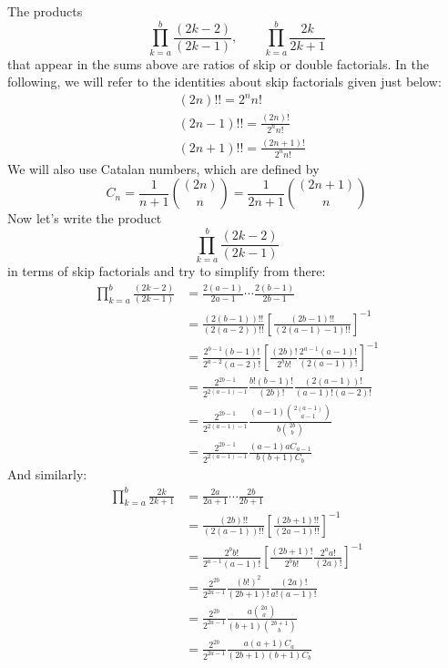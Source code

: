 \documentclass[11pt]{article}
\theoremstyle{definition}
\theoremstyle{definition}
\theoremstyle{plain}
\theoremstyle{plain}
\theoremstyle{plain}
\theoremstyle{definition}
\begin{document}
The products
\begin{equation*}
\prod\limits_{k=a}^{b}\frac{(2k-2)}{(2k-1)},\qquad\prod\limits_{k=a}^b\frac{2k}{2k+1}
\end{equation*}
that appear in the sums above are ratios of skip or double factorials. In the following, we will refer to the identities about skip factorials given just below:
\begin{align*}
&(2n)!! = 2^nn! \\
&(2n-1)!! = \frac{(2n)!}{2^nn!} \\
&(2n+1)!! = \frac{(2n+1)!}{2^nn!}
\end{align*}
We will also use Catalan numbers, which are defined by
\begin{equation*}
C_n = \frac{1}{n+1}\binom{(2n)}{n} = \frac{1}{2n+1}\binom{(2n+1)}{n}
\end{equation*}
Now let's write the product
\begin{equation*}
\prod\limits_{k=a}^{b}\frac{(2k-2)}{(2k-1)}
\end{equation*}
in terms of skip factorials and try to simplify from there:
\begin{align*}
\prod\limits_{k=a}^{b}\frac{(2k-2)}{(2k-1)} &= \frac{2(a-1)}{2a-1}\cdots\frac{2(b-1)}{2b-1} \\
&= \frac{(2(b-1))!!}{(2(a-2))!!}\left[\frac{(2b-1)!!}{(2(a-1)-1)!!}\right]^{-1} \\
&= \frac{2^{b-1}(b-1)!}{2^{a-2}(a-2)!}\left[\frac{(2b)!}{2^bb!}\frac{2^{a-1}(a-1)!}{(2(a-1))!}\right]^{-1} \\
&= \frac{2^{2b-1}}{2^{2(a-1)-1}}\frac{b!(b-1)!}{(2b)!}\frac{(2(a-1))!}{(a-1)!(a-2)!} \\
&= \frac{2^{2b-1}}{2^{2(a-1)-1}}\frac{(a-1)\binom{2(a-1)}{a-1}}{b\binom{2b}{b}} \\
&= \frac{2^{2b-1}}{2^{2(a-1)-1}}\frac{(a-1)aC_{a-1}}{b(b+1)C_b}
\end{align*}
And similarly:
\begin{align*}
\prod\limits_{k=a}^b\frac{2k}{2k+1} &= \frac{2a}{2a+1}\cdots\frac{2b}{2b+1} \\
&= \frac{(2b)!!}{(2(a-1))!!}\left[\frac{(2b+1)!!}{(2a-1)!!}\right]^{-1} \\
&= \frac{2^bb!}{2^{a-1}(a-1)!}\left[\frac{(2b+1)!}{2^bb!}\frac{2^aa!}{(2a)!}\right]^{-1} \\
&= \frac{2^{2b}}{2^{2a-1}}\frac{(b!)^2}{(2b+1)!}\frac{(2a)!}{a!(a-1)!} \\
&= \frac{2^{2b}}{2^{2a-1}}\frac{a\binom{2a}{a}}{(b+1)\binom{2b+1}{b}} \\
&= \frac{2^{2b}}{2^{2a-1}}\frac{a(a+1)C_a}{(2b+1)(b+1)C_b}
\end{align*}
\end{document}
